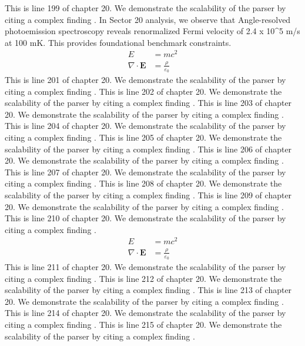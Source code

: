 This is line 199 of chapter 20. We demonstrate the scalability of the parser by citing a complex finding \cite{ref20_199}.
In Sector 20 analysis, we observe that Angle-resolved photoemission spectroscopy reveals renormalized Fermi velocity of 2.4 x 10^5 m/s at 100 mK. This provides foundational benchmark constraints.
\begin{align*}
  E &= mc^2 \\
  \nabla \cdot \mathbf{E} &= \frac{\rho}{\varepsilon_0}
\end{align*}
This is line 201 of chapter 20. We demonstrate the scalability of the parser by citing a complex finding \cite{ref20_201}.
This is line 202 of chapter 20. We demonstrate the scalability of the parser by citing a complex finding \cite{ref20_202}.
This is line 203 of chapter 20. We demonstrate the scalability of the parser by citing a complex finding \cite{ref20_203}.
This is line 204 of chapter 20. We demonstrate the scalability of the parser by citing a complex finding \cite{ref20_204}.
This is line 205 of chapter 20. We demonstrate the scalability of the parser by citing a complex finding \cite{ref20_205}.
This is line 206 of chapter 20. We demonstrate the scalability of the parser by citing a complex finding \cite{ref20_206}.
This is line 207 of chapter 20. We demonstrate the scalability of the parser by citing a complex finding \cite{ref20_207}.
This is line 208 of chapter 20. We demonstrate the scalability of the parser by citing a complex finding \cite{ref20_208}.
This is line 209 of chapter 20. We demonstrate the scalability of the parser by citing a complex finding \cite{ref20_209}.
This is line 210 of chapter 20. We demonstrate the scalability of the parser by citing a complex finding \cite{ref20_210}.
\begin{align*}
  E &= mc^2 \\
  \nabla \cdot \mathbf{E} &= \frac{\rho}{\varepsilon_0}
\end{align*}
This is line 211 of chapter 20. We demonstrate the scalability of the parser by citing a complex finding \cite{ref20_211}.
This is line 212 of chapter 20. We demonstrate the scalability of the parser by citing a complex finding \cite{ref20_212}.
This is line 213 of chapter 20. We demonstrate the scalability of the parser by citing a complex finding \cite{ref20_213}.
This is line 214 of chapter 20. We demonstrate the scalability of the parser by citing a complex finding \cite{ref20_214}.
This is line 215 of chapter 20. We demonstrate the scalability of the parser by citing a complex finding \cite{ref20_215}.
